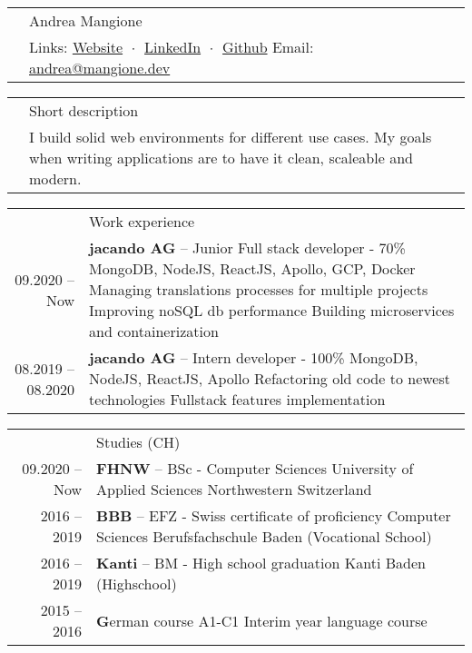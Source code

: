 \documentclass[letterpaper, 11pt]{article}
\newcommand{\header}{\Large\color{RedOrange}}
\newenvironment{SectionTable}[1]{
	\renewcommand*{\arraystretch}{1.7}
	\setlength{\tabcolsep}{10pt}
	\begin{longtable}{Rp{5.2in}} & #1 \\}
{\end{longtable}\vspace{-.3cm}}
\newenvironment{SectionTableSingleSpace}[1]{
	\renewcommand*{\arraystretch}{1.2}
	\setlength{\tabcolsep}{10pt}
	\begin{longtable}{Rp{5.2in}} & #1 \\[0.6em]}
{\end{longtable}\vspace{-.3cm}}
\begin{document}
\begin{SectionTable}{\Huge Andrea Mangione} & 
Links:
\href{https://andrea.mangione.dev}{Website}  $\;\boldsymbol{\cdot}\;$ 
\href{https://www.linkedin.com/in/andrea-mangione-592902156}{LinkedIn}  $\;\boldsymbol{\cdot}\;$ 
\href{https://github.com/MangioneAndrea}{Github}\newline
Email: 
\href{mailto:andrea@mangione.dev}{andrea@mangione.dev} 
\end{SectionTable}


\begin{SectionTable}{\header Short description}
&  I build solid web environments for different use cases. My goals when writing applications are to have it clean, scaleable and modern. 
\end{SectionTable}


\begin{SectionTable}{\header Work experience}
09.2020 -- Now & 
\textbf{jacando AG} -- Junior Full stack developer - 70\% \newline
MongoDB, NodeJS, ReactJS, Apollo, GCP, Docker \newline 
Managing translations processes for multiple projects \newline
Improving noSQL db performance\newline
Building microservices and containerization\newline\\

08.2019 -- 08.2020 & 
\textbf{jacando AG} -- Intern developer - 100\% \newline
MongoDB, NodeJS, ReactJS, Apollo \newline 
Refactoring old code to newest technologies\newline
Fullstack features implementation\\

\end{SectionTable}


\begin{SectionTableSingleSpace}{\header Studies (CH)}
09.2020 -- Now & 
\textbf{FHNW} -- BSc - Computer Sciences  \newline
University of Applied Sciences Northwestern Switzerland \\

2016 -- 2019 & 
\textbf{BBB} -- EFZ - Swiss certificate of proficiency Computer Sciences  \newline
Berufsfachschule Baden (Vocational School) \\
2016 -- 2019 & 
\textbf{Kanti} -- BM - High school graduation  \newline
Kanti Baden (Highschool) \\
2015 -- 2016 & 
\textbf German course A1-C1  \newline
Interim year language course \\

\end{SectionTableSingleSpace}
\end{document}
